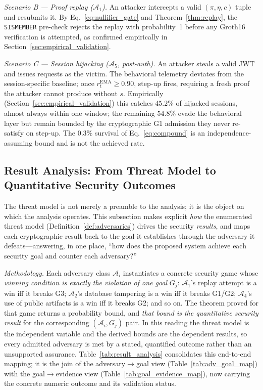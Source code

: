 \documentclass[journal,twoside,10pt]{IEEEtran}
\begin{document}
\textit{Scenario B --- Proof replay ($\mathcal{A}_1$).} An attacker
intercepts a valid $(\pi,\eta,c)$ tuple and resubmits it. By
Eq.~\ref{eq:nullifier_gate} and Theorem~\ref{thm:replay}, the
\texttt{SISMEMBER} pre-check rejects the replay with probability~1 before
any Groth16 verification is attempted, as confirmed empirically in
Section~\ref{sec:empirical_validation}.

\textit{Scenario C --- Session hijacking ($\mathcal{A}_5$, post-auth).} An
attacker steals a valid JWT and issues requests as the victim. The
behavioral telemetry deviates from the session-specific baseline; once
$r_t^{\text{EMA}}\ge0.90$, step-up fires, requiring a fresh proof the
attacker cannot produce without $s$. Empirically
(Section~\ref{sec:empirical_validation}) this catches $45.2\%$ of hijacked
sessions, almost always within one window; the remaining $54.8\%$ evade
the behavioral layer but remain bounded by the cryptographic G1 admission
they never re-satisfy on step-up. The $0.3\%$ survival of
Eq.~\ref{eq:compound} is an independence-assuming bound and is not the
achieved rate.

\subsection{Result Analysis: From Threat Model to Quantitative Security Outcomes}
\label{sec:result_analysis}
The threat model is not merely a preamble to the analysis; it is the object
on which the analysis operates. This subsection makes explicit \emph{how}
the enumerated threat model (Definition~\ref{def:adversaries}) drives the
security \emph{results}, and maps each cryptographic result back to the
goal it establishes through the adversary it defeats---answering, in one
place, ``how does the proposed system achieve each security goal and
counter each adversary?''

\textit{Methodology.} Each adversary class $\mathcal{A}_i$ instantiates a
concrete security game whose \emph{winning condition is exactly the
violation of one goal} $G_j$: $\mathcal{A}_1$'s replay attempt is a win iff
it breaks G3; $\mathcal{A}_2$'s database tampering is a win iff it breaks
G1/G2; $\mathcal{A}_4$'s use of public artifacts is a win iff it breaks G2;
and so on. The theorem proved for that game returns a probability bound,
and \emph{that bound is the quantitative security result} for the
corresponding $(\mathcal{A}_i, G_j)$ pair. In this reading the threat model
is the independent variable and the derived bounds are the dependent
results, so every admitted adversary is met by a stated, quantified outcome
rather than an unsupported assurance. Table~\ref{tab:result_analysis}
consolidates this end-to-end mapping; it is the join of the
adversary$\rightarrow$goal view (Table~\ref{tab:adv_goal_map}) with the
goal$\rightarrow$evidence view (Table~\ref{tab:goal_evidence_map}), now
carrying the concrete numeric outcome and its validation status.
\end{document}

